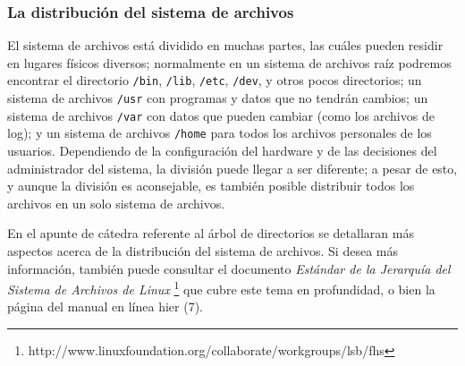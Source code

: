 \documentclass[12pt]{article}
\begin{document}
\subsubsection{ La distribución del sistema de archivos}



 El sistema de archivos está dividido en muchas partes, las cuáles pueden residir
en lugares físicos diversos; normalmente en un sistema de archivos raíz podremos 
encontrar el directorio \texttt{/bin}, \texttt{/lib}, \texttt{/etc}, \texttt{/dev},
y otros pocos directorios; un sistema de archivos \texttt{/usr} con programas y datos que
no tendrán cambios; un sistema de archivos \texttt{/var} con datos que pueden cambiar
(como los archivos de log); y un sistema de archivos \texttt{/home}
para todos los archivos personales de los usuarios. Dependiendo de la
configuración del hardware y de las decisiones del administrador del sistema, la
división puede llegar a ser diferente; a pesar de esto, y aunque la división es
aconsejable, es también posible distribuir todos los archivos en un solo sistema
de archivos.  

 En el apunte de cátedra referente al árbol de directorios se detallaran más 
aspectos acerca de la distribución del sistema de archivos. Si desea más información,
también puede consultar el documento \textit{Estándar de la Jerarquía del Sistema de Archivos
de Linux} 
\footnote{http://www.linuxfoundation.org/collaborate/workgroups/lsb/fhs}
que cubre este tema en profundidad, o bien la página del manual en línea hier (7).


\end{document}

